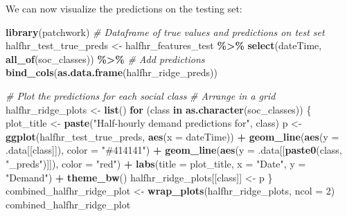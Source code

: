 \documentclass[
]{article}
\newenvironment{Shaded}{\begin{snugshade}}{\end{snugshade}}
\newcommand{\AttributeTok}[1]{\textcolor[rgb]{0.13,0.29,0.53}{#1}}
\newcommand{\CommentTok}[1]{\textcolor[rgb]{0.56,0.35,0.01}{\textit{#1}}}
\newcommand{\ControlFlowTok}[1]{\textcolor[rgb]{0.13,0.29,0.53}{\textbf{#1}}}
\newcommand{\DecValTok}[1]{\textcolor[rgb]{0.00,0.00,0.81}{#1}}
\newcommand{\FunctionTok}[1]{\textcolor[rgb]{0.13,0.29,0.53}{\textbf{#1}}}
\newcommand{\NormalTok}[1]{#1}
\newcommand{\OtherTok}[1]{\textcolor[rgb]{0.56,0.35,0.01}{#1}}
\newcommand{\SpecialCharTok}[1]{\textcolor[rgb]{0.81,0.36,0.00}{\textbf{#1}}}
\newcommand{\StringTok}[1]{\textcolor[rgb]{0.31,0.60,0.02}{#1}}
\begin{document}
We can now visualize the predictions on the testing set:

\begin{Shaded}
\begin{Highlighting}[]
\FunctionTok{library}\NormalTok{(patchwork)}
\CommentTok{\# Dataframe of true values and predictions on test set}
\NormalTok{halfhr\_test\_true\_preds }\OtherTok{\textless{}{-}}\NormalTok{ halfhr\_features\_test }\SpecialCharTok{\%\textgreater{}\%} 
  \FunctionTok{select}\NormalTok{(dateTime, }\FunctionTok{all\_of}\NormalTok{(soc\_classes)) }\SpecialCharTok{\%\textgreater{}\%} 
  \CommentTok{\# Add predictions}
  \FunctionTok{bind\_cols}\NormalTok{(}\FunctionTok{as.data.frame}\NormalTok{(halfhr\_ridge\_preds))}

\CommentTok{\# Plot the predictions for each social class}
\CommentTok{\# Arrange in a grid}
\NormalTok{halfhr\_ridge\_plots }\OtherTok{\textless{}{-}} \FunctionTok{list}\NormalTok{()}
\ControlFlowTok{for}\NormalTok{ (class }\ControlFlowTok{in} \FunctionTok{as.character}\NormalTok{(soc\_classes)) \{}
\NormalTok{  plot\_title }\OtherTok{\textless{}{-}} \FunctionTok{paste}\NormalTok{(}\StringTok{"Half{-}hourly demand predictions for"}\NormalTok{, class)}
\NormalTok{  p }\OtherTok{\textless{}{-}} \FunctionTok{ggplot}\NormalTok{(halfhr\_test\_true\_preds, }\FunctionTok{aes}\NormalTok{(}\AttributeTok{x =}\NormalTok{ dateTime)) }\SpecialCharTok{+}
    \FunctionTok{geom\_line}\NormalTok{(}\FunctionTok{aes}\NormalTok{(}\AttributeTok{y =}\NormalTok{ .data[[class]]), }\AttributeTok{color =} \StringTok{"\#414141"}\NormalTok{) }\SpecialCharTok{+}
    \FunctionTok{geom\_line}\NormalTok{(}\FunctionTok{aes}\NormalTok{(}\AttributeTok{y =}\NormalTok{ .data[[}\FunctionTok{paste0}\NormalTok{(class, }\StringTok{"\_preds"}\NormalTok{)]]), }\AttributeTok{color =} \StringTok{"red"}\NormalTok{) }\SpecialCharTok{+}
    \FunctionTok{labs}\NormalTok{(}\AttributeTok{title =}\NormalTok{ plot\_title, }\AttributeTok{x =} \StringTok{"Date"}\NormalTok{, }\AttributeTok{y =} \StringTok{"Demand"}\NormalTok{) }\SpecialCharTok{+}
    \FunctionTok{theme\_bw}\NormalTok{()}
\NormalTok{  halfhr\_ridge\_plots[[class]] }\OtherTok{\textless{}{-}}\NormalTok{ p}
\NormalTok{\}}
\NormalTok{combined\_halfhr\_ridge\_plot }\OtherTok{\textless{}{-}} \FunctionTok{wrap\_plots}\NormalTok{(halfhr\_ridge\_plots, }\AttributeTok{ncol =} \DecValTok{2}\NormalTok{)}
\NormalTok{combined\_halfhr\_ridge\_plot}
\end{Highlighting}
\end{Shaded}
\end{document}

